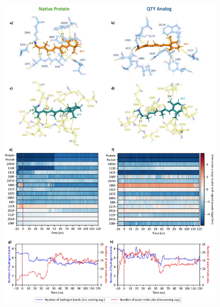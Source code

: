 \documentclass[fleqn, 10pt]{manuscript}
\begin{document}
\begin{figure}[htbp]
	\centering
	\includegraphics[width=\linewidth]{Figures/function-binding.jpg}
\end{figure}
\end{document}
